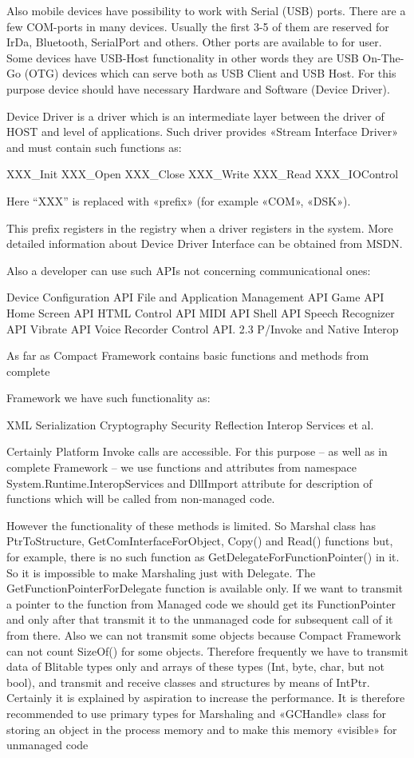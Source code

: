 Also mobile devices have possibility to work with Serial (USB) ports. There are a
few COM-ports in many devices. Usually the first 3-5 of them are reserved for
IrDa, Bluetooth, SerialPort and others. Other ports are available to for user.
Some devices have USB-Host functionality in other words they are USB On-The-Go
(OTG) devices which can serve both as USB Client and USB Host. For this purpose
device should have necessary Hardware and Software (Device Driver).

Device Driver is a driver which is an intermediate layer between the driver of
HOST and  level of applications. Such driver provides «Stream Interface Driver»
and must contain such functions as:

XXX\_Init XXX\_Open XXX\_Close XXX\_Write XXX\_Read XXX\_IOControl

Here “XXX” is replaced with «prefix» (for example «COM», «DSK»).

This prefix registers in the registry when a driver registers in the system. More
detailed information about Device Driver Interface can be obtained from MSDN.

Also a developer can use such APIs not concerning communicational ones:

Device Configuration API File and Application Management API Game API Home Screen
API HTML Control API MIDI API Shell API Speech Recognizer API Vibrate API Voice
Recorder Control API. 2.3 P/Invoke and Native Interop

As far as Compact Framework contains basic functions and methods from complete

Framework we have such functionality as:

XML Serialization Cryptography Security Reflection Interop Services et al.

Certainly Platform Invoke calls are accessible. For this purpose – as well as in
complete Framework – we use functions and attributes from namespace
System.Runtime.InteropServices and DllImport attribute for description of
functions which will be called from non-managed code.

However the functionality of these methods is limited. So Marshal class has
PtrToStructure, GetComInterfaceForObject, Copy() and Read() functions but, for
example, there is no such function as GetDelegateForFunctionPointer() in it. So
it is impossible to make Marshaling just with Delegate. The
GetFunctionPointerForDelegate function is available only. If we want to transmit
a pointer to the function from Managed code we should get its FunctionPointer and
only after that transmit it to the unmanaged code for subsequent call of it from
there. Also we can not transmit some objects because Compact Framework can not
count SizeOf() for some objects. Therefore frequently we have to transmit  data
of Blitable types only and arrays of these types (Int, byte, char, but not bool),
 and transmit and receive  classes and structures by means of IntPtr. Certainly
it is explained by aspiration to increase the performance. It is therefore
recommended to use primary types for Marshaling and «GCHandle» class for storing
an object in the process memory and to make this memory «visible» for unmanaged
code

